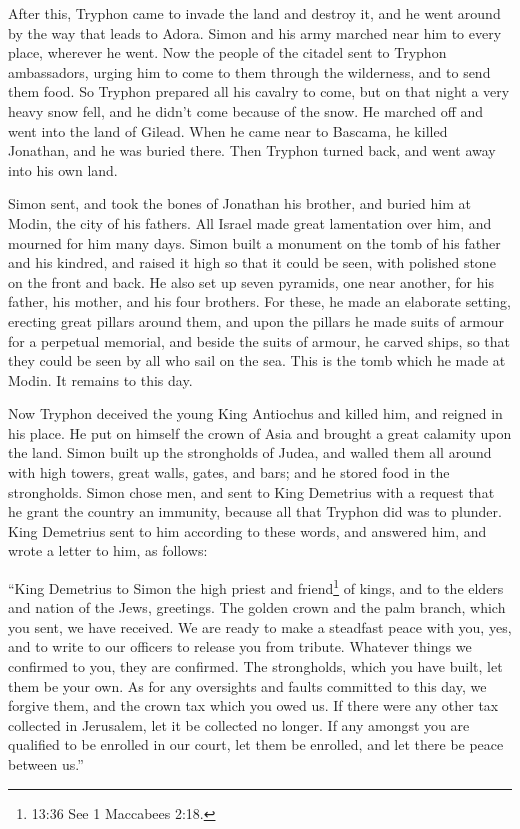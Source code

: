  After this, Tryphon came to invade the land and destroy
it, and he went around by the way that leads to Adora. Simon and his
army marched near him to every place, wherever he went. 
Now the people of the citadel sent to Tryphon ambassadors, urging him to
come to them through the wilderness, and to send them food.
 So Tryphon prepared all his cavalry to come, but on that
night a very heavy snow fell, and he didn't come because of the snow. He
marched off and went into the land of Gilead.  When he came
near to Bascama, he killed Jonathan, and he was buried there.
 Then Tryphon turned back, and went away into his own land.

 Simon sent, and took the bones of Jonathan his brother,
and buried him at Modin, the city of his fathers.  All
Israel made great lamentation over him, and mourned for him many days.
 Simon built a monument on the tomb of his father and his
kindred, and raised it high so that it could be seen, with polished
stone on the front and back.  He also set up seven
pyramids, one near another, for his father, his mother, and his four
brothers.  For these, he made an elaborate setting,
erecting great pillars around them, and upon the pillars he made suits
of armour for a perpetual memorial, and beside the suits of armour, he
carved ships, so that they could be seen by all who sail on the sea.
 This is the tomb which he made at Modin. It remains to
this day.

 Now Tryphon deceived the young King Antiochus and killed
him,  and reigned in his place. He put on himself the crown
of Asia and brought a great calamity upon the land.  Simon
built up the strongholds of Judea, and walled them all around with high
towers, great walls, gates, and bars; and he stored food in the
strongholds.  Simon chose men, and sent to King Demetrius
with a request that he grant the country an immunity, because all that
Tryphon did was to plunder.  King Demetrius sent to him
according to these words, and answered him, and wrote a letter to him,
as follows:

 ``King Demetrius to Simon the high priest and
friend\footnote{13:36 See 1 Maccabees 2:18.} of kings, and to the elders
and nation of the Jews, greetings.  The golden crown and
the palm branch, which you sent, we have received. We are ready to make
a steadfast peace with you, yes, and to write to our officers to release
you from tribute.  Whatever things we confirmed to you,
they are confirmed. The strongholds, which you have built, let them be
your own.  As for any oversights and faults committed to
this day, we forgive them, and the crown tax which you owed us. If there
were any other tax collected in Jerusalem, let it be collected no
longer.  If any amongst you are qualified to be enrolled in
our court, let them be enrolled, and let there be peace between us.''

